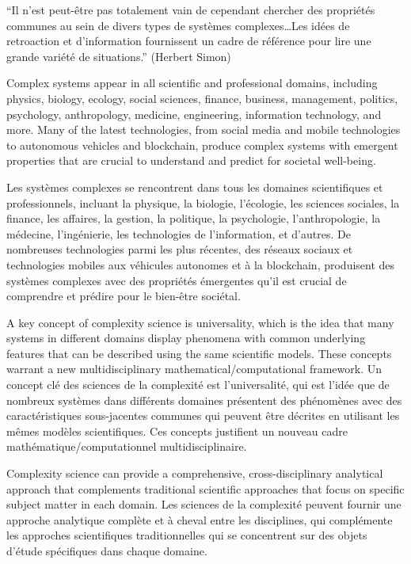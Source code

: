 \documentclass[12pt]{article}
\begin{document}
``Il n'est peut-être pas totalement vain de cependant chercher des propriétés communes au sein de divers types de systèmes complexes\ldots Les idées de retroaction et d'information fournissent un cadre de référence pour lire une grande variété de situations.'' (Herbert Simon)


Complex systems appear in all scientific and professional domains, including physics, biology, ecology, social sciences, finance, business, management, politics, psychology, anthropology, medicine, engineering, information technology, and more. Many of the latest technologies, from social media and mobile technologies to autonomous vehicles and blockchain, produce complex systems with emergent properties that are crucial to understand and predict for societal well-being.

Les systèmes complexes se rencontrent dans tous les domaines scientifiques et professionnels, incluant la physique, la biologie, l'écologie, les sciences sociales, la finance, les affaires, la gestion, la politique, la psychologie, l'anthropologie, la médecine, l'ingénierie, les technologies de l'information, et d'autres. De nombreuses technologies parmi les plus récentes, des réseaux sociaux et technologies mobiles aux véhicules autonomes et à la blockchain, produisent des systèmes complexes avec des propriétés émergentes qu'il est crucial de comprendre et prédire pour le bien-être sociétal.

A key concept of complexity science is universality, which is the idea that many systems in different domains display phenomena with common underlying features that can be described using the same scientific models. These concepts warrant a new multidisciplinary mathematical/computational framework.
Un concept clé des sciences de la complexité est l'universalité, qui est l'idée que de nombreux systèmes dans différents domaines présentent des phénomènes avec des caractéristiques sous-jacentes communes qui peuvent être décrites en utilisant les mêmes modèles scientifiques. Ces concepts justifient un nouveau cadre mathématique/computationnel multidisciplinaire.

Complexity science can provide a comprehensive, cross-disciplinary analytical approach that complements traditional scientific approaches that focus on specific subject matter in each domain.
Les sciences de la complexité peuvent fournir une approche analytique complète et à cheval entre les disciplines, qui complémente les approches scientifiques traditionnelles qui se concentrent sur des objets d'étude spécifiques dans chaque domaine.
\end{document}
